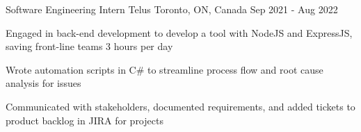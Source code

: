 
\begin{cventries}

  \cventry
    {Software Engineering Intern} %
    {Telus} %
    {Toronto, ON, Canada} %
    {Sep 2021 - Aug 2022} %
    {
      \begin{cvitems} %
\item Engaged in back-end development to develop a tool with NodeJS and ExpressJS, saving front-line teams 3 hours per day
\item Wrote automation scripts in C\# to streamline process flow and root cause analysis for issues
\item Communicated with stakeholders, documented requirements, and added tickets to product backlog  in JIRA for projects
      \end{cvitems}
    }


\end{cventries}
